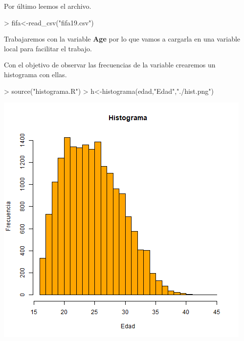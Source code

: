 \documentclass [a4paper] {article}
\begin{document}
\bigskip
Por \'ultimo leemos el archivo.
\begin{Schunk}
\begin{Sinput}
> fifa<-read_csv("fifa19.csv")
\end{Sinput}
\end{Schunk}

\bigskip
Trabajaremos con la variable \textbf{Age} por lo que vamos a cargarla en una variable
local para facilitar el trabajo.
\begin{Schunk}
\end{Schunk}

\bigskip
Con el objetivo de observar las frecuencias de la variable crearemos un histograma con ellas.
\begin{Schunk}
\begin{Sinput}
> source("histograma.R")
> h<-histograma(edad,"Edad","./hist.png")
\end{Sinput}
\end{Schunk}
\includegraphics[width=\textwidth]{hist}
\end{document}
